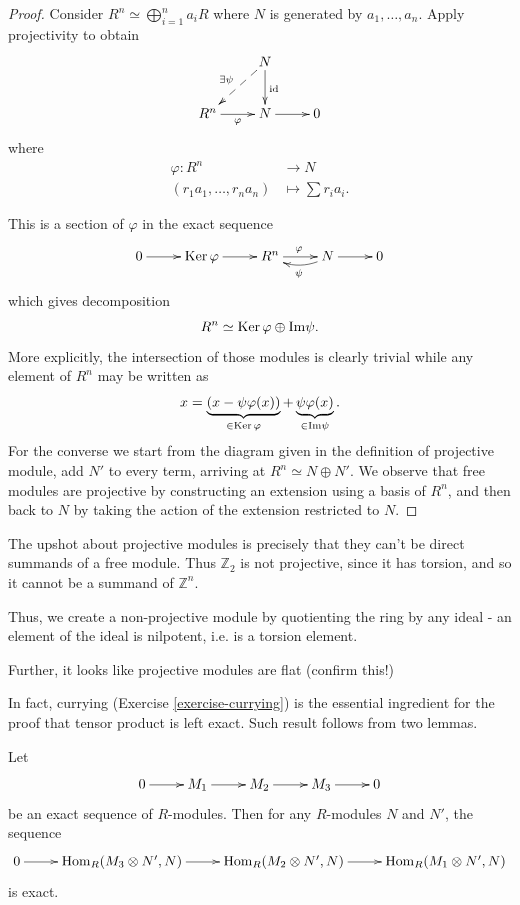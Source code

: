 \begin{proof}
Consider $R^n \simeq \bigoplus_{i=1}^n a_iR$
where $N$ is generated by $a_1,…,a_n$.
Apply projectivity to obtain
$$
\xymatrix{
&N \ar[d]^{\text{id}}\ar@{-->}[dl]_{\exists
\psi}\\
R^n\ar[r]_-\varphi& N \ar[r]& 0
}
$$
where
$$
\begin{aligned}
\varphi: R^n &\longrightarrow N \\
(r_1a_1,…,r_na_n) &\longmapsto \sum r_ia_i.
\end{aligned}
$$

\noindent
This is a section of $\varphi$ in the exact
sequence
$$
\xymatrix{
0\ar[r]
&\Ker \varphi\ar[r]
&R^n\ar[r]^{\varphi}
&N\ar[r]\ar@/_-.5pc/[l]^\psi
&0
}
$$
which gives decomposition
$$
R^n \simeq \mathop{\mathrm{Ker}}\varphi \oplus \text{Im}\psi.
$$
More explicitly, the intersection of those
modules is clearly trivial
while any element of $R^n$ may be written as
$$
x=\underbrace{(x-\psi \varphi(x))}_{\in \mathop{\mathrm{Ker}}
\varphi}
+\underbrace{\psi\varphi(x)}_{\in
\text{Im}\psi}.
$$
For the converse we start from the diagram
given in the definition
of projective module, add $N'$ to every term,
arriving
at $R^n\simeq N\oplus N'$. We observe that
free modules
are projective by constructing an extension
using a basis of $R^n$,
and then back to $N$ by taking the action of
the extension restricted to $N$.
\end{proof}

\noindent
The upshot about projective modules
is precisely that they can't be
direct summands of a free module.
Thus $\mathbb{Z}_2$ is not projective,
since it has torsion, and
so it cannot be a summand of $\mathbb{Z}^n$.

Thus, we create a non-projective module
by quotienting the ring by any ideal
- an element of the ideal is nilpotent,
i.e. is a torsion element.

Further, it looks like projective modules
are flat (confirm this!)

\medskip\noindent
In fact, currying (Exercise
\ref{exercise-currying})
is the essential ingredient
for the proof that tensor product is left
exact.
Such result follows from two lemmas.

\begin{lemma}
\label{lemma-tenso-produ-funct-left-exact}
Let
$$
\xymatrix{
0\ar[r]
&M_1\ar[r]
&M_2\ar[r]
&M_3\ar[r]
&0
}
$$
be an exact sequence of $R$-modules.
Then for any $R$-modules $N$ and $N'$,
the sequence
$$
\xymatrix{
0\ar[r]
&\Hom_R(M_3 \otimes N',N)\ar[r]
&\Hom_R(M_2 \otimes N',N)\ar[r]
&\Hom_R(M_1 \otimes N',N)
}
$$
is exact.
\end{lemma}

